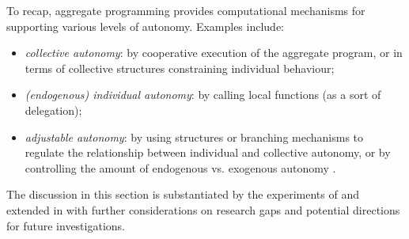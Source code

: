 To recap, aggregate programming provides computational mechanisms for supporting various levels of autonomy. Examples include:
\begin{itemize}
\item \emph{collective autonomy}: by cooperative execution of the aggregate program, or in terms of collective structures constraining individual behaviour;
\item \emph{(endogenous) individual autonomy}: by calling local functions (as a sort of delegation);
\item \emph{adjustable autonomy}: by using structures or branching mechanisms to regulate the relationship between individual and collective autonomy, or by controlling the amount of endogenous vs. exogenous autonomy .
\end{itemize}
%
The discussion in this section is substantiated by the experiments
 of 
 and extended in 
 with further considerations on research gaps
 and potential directions for future investigations.

